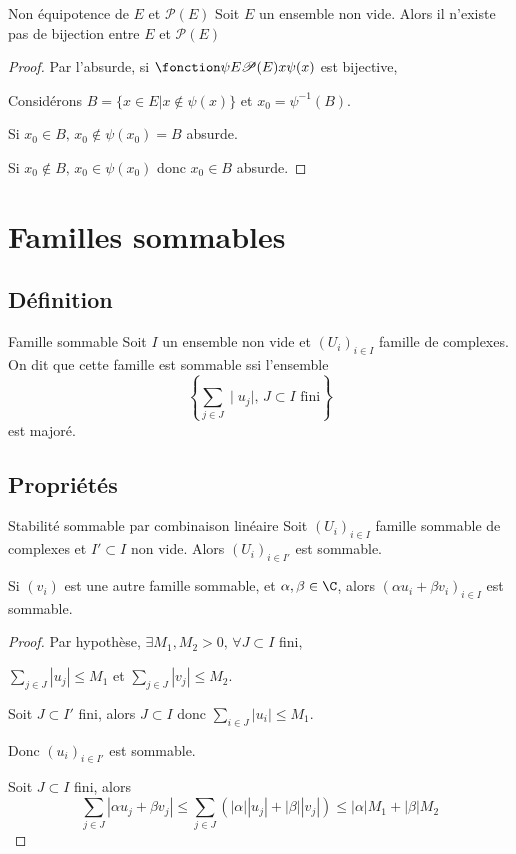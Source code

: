 \begin{theoreme}{Non équipotence de $E$ et $\mathscr P(E)$}{}
    Soit $E$ un ensemble non vide. Alors il n'existe pas de bijection entre $E$ et $\mathscr P(E)$
\end{theoreme}

\begin{proof}
    Par l'absurde, si $\fonction \psi E {\mathscr P(E)} x {\psi(x)}$ est bijective,

    Considérons $B = \{ x \in E | x \notin \psi(x) \} $ et $x_0 = \psi^{-1}(B)$.

    Si $x_0 \in B, \, x_0 \notin \psi(x_0) = B$ absurde.

    Si $x_0 \notin B, \, x_0 \in \psi(x_0)$ donc $x_0 \in B$ absurde. 
\end{proof}


\section{Familles sommables}
\subsection{Définition }

\begin{definition}{Famille sommable}{}
    Soit $I$ un ensemble non vide et $(U_i)_{i \in I}$ famille de complexes. 
    On dit que cette famille est sommable ssi l'ensemble 
    $$\left\{\sum_{j \in J} \mid u_j \mid, \, J \subset I \text{ fini} \right\}$$
    est majoré. 
\end{definition}


\subsection{Propriétés }

\begin{proposition}{Stabilité sommable par combinaison linéaire}{}
    Soit $(U_i)_{i \in I}$ famille sommable de complexes et $I' \subset I$ non vide. 
    Alors $(U_i)_{i \in I'}$ est sommable. 

    Si $(v_i)$ est une autre famille sommable, et $\alpha, \beta \in \C$, alors 
    $(\alpha u_i + \beta v_i)_{i \in I}$ est sommable.
\end{proposition}


\begin{proof}
    Par hypothèse, $\exists M_1, M_2 > 0, \, \forall J \subset I$ fini, 

    $\displaystyle \sum_{j \in J} |u_j| \leqslant M_1$ et $\displaystyle \sum_{j \in J} |v_j| \leqslant M_2$.

    Soit $J \subset I'$ fini, alors $J \subset I$ donc $\sum_{i \in J } |u_i| \leqslant M_1$.

    Donc $(u_i)_{i \in I'}$ est sommable.

    Soit $J \subset I$ fini, alors
    $$\sum_{j \in J} |\alpha u_j + \beta v_j | \leqslant \sum_{j \in J} (|\alpha| |u_j| + |\beta| |v_j|) \leqslant |\alpha| M_1 + |\beta| M_2$$
\end{proof}


